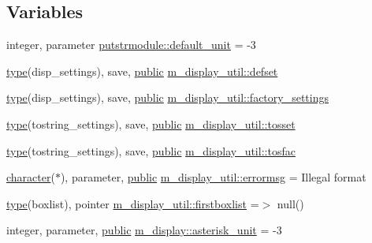 \subsection*{Variables}
\begin{DoxyCompactItemize}
\item 
integer, parameter \hyperlink{namespaceputstrmodule_a7ec14945bb8449f20f21c0545b1825ee}{putstrmodule\+::default\+\_\+unit} = -\/3
\item 
\hyperlink{stop__watch_83_8txt_a70f0ead91c32e25323c03265aa302c1c}{type}(disp\+\_\+settings), save, \hyperlink{M__stopwatch_83_8txt_a2f74811300c361e53b430611a7d1769f}{public} \hyperlink{namespacem__display__util_a94e5894dfc5e8a59b6ceac6721ae4f8e}{m\+\_\+display\+\_\+util\+::defset}
\item 
\hyperlink{stop__watch_83_8txt_a70f0ead91c32e25323c03265aa302c1c}{type}(disp\+\_\+settings), save, \hyperlink{M__stopwatch_83_8txt_a2f74811300c361e53b430611a7d1769f}{public} \hyperlink{namespacem__display__util_a9ce4a22503d46c3cf4d1a054812827c0}{m\+\_\+display\+\_\+util\+::factory\+\_\+settings}
\item 
\hyperlink{stop__watch_83_8txt_a70f0ead91c32e25323c03265aa302c1c}{type}(tostring\+\_\+settings), save, \hyperlink{M__stopwatch_83_8txt_a2f74811300c361e53b430611a7d1769f}{public} \hyperlink{namespacem__display__util_a5c904147cafd4110a901207d859bdf7b}{m\+\_\+display\+\_\+util\+::tosset}
\item 
\hyperlink{stop__watch_83_8txt_a70f0ead91c32e25323c03265aa302c1c}{type}(tostring\+\_\+settings), save, \hyperlink{M__stopwatch_83_8txt_a2f74811300c361e53b430611a7d1769f}{public} \hyperlink{namespacem__display__util_a0bd80d23e6e5fec3979a3357f65fb5e3}{m\+\_\+display\+\_\+util\+::tosfac}
\item 
\hyperlink{option__stopwatch_83_8txt_abd4b21fbbd175834027b5224bfe97e66}{character}($\ast$), parameter, \hyperlink{M__stopwatch_83_8txt_a2f74811300c361e53b430611a7d1769f}{public} \hyperlink{namespacem__display__util_a844bf51463bbf006c07c60eb75a44051}{m\+\_\+display\+\_\+util\+::errormsg} = \textquotesingle{}Illegal format\textquotesingle{}
\item 
\hyperlink{stop__watch_83_8txt_a70f0ead91c32e25323c03265aa302c1c}{type}(boxlist), pointer \hyperlink{namespacem__display__util_af285f44a47c745fc4da9df4a73269ac2}{m\+\_\+display\+\_\+util\+::firstboxlist} =$>$ null()
\item 
integer, parameter, \hyperlink{M__stopwatch_83_8txt_a2f74811300c361e53b430611a7d1769f}{public} \hyperlink{namespacem__display_a9d76146cf157a888cfc94f84a8ec440f}{m\+\_\+display\+::asterisk\+\_\+unit} = -\/3

\end{DoxyCompactItemize}
